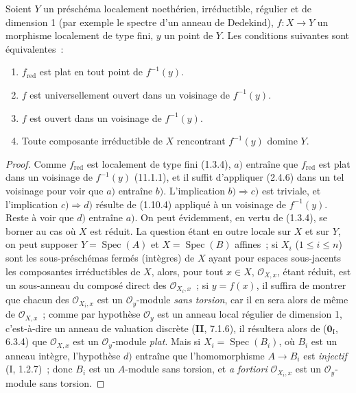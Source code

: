 \begin{proposition}[14.3.8]
Soient $Y$ un préschéma localement noethérien, irréductible, régulier et de
dimension 1 (par exemple le spectre d'un anneau de Dedekind), $f:X\to Y$ un
morphisme localement de type fini, $y$ un point de $Y$. Les conditions suivantes
sont équivalentes~:
\begin{enumerate}[label=\emph{\alph*)}]
  \item $f_{\mathrm{red}}$ est plat en tout point de $f^{-1}(y)$.
  \item $f$ est universellement ouvert dans un voisinage de $f^{-1}(y)$.
  \item $f$ est ouvert dans un voisinage de $f^{-1}(y)$.
  \item Toute composante irréductible de $X$ rencontrant $f^{-1}(y)$ domine $Y$.
\end{enumerate}
\end{proposition}

\begin{proof}
Comme $f_{\mathrm{red}}$ est localement de type fini (1.3.4), $a)$ entraîne que
$f_{\mathrm{red}}$ est plat dans un voisinage de $f^{-1}(y)$ (11.1.1), et il
suffit d'appliquer (2.4.6) dans un tel voisinage pour voir que $a)$ entraîne $b)$.
L'implication $b)\Rightarrow c)$ est triviale, et l'implication
$c)\Rightarrow d)$ résulte de (1.10.4) appliqué à un voisinage de $f^{-1}(y)$.
Reste à voir que $d)$ entraîne $a)$. On peut évidemment, en vertu de (1.3.4), se
borner au cas où $X$ est réduit. La question étant en outre locale sur $X$ et sur
$Y$, on peut supposer $Y=\operatorname{Spec}(A)$ et
$X=\operatorname{Spec}(B)$
affines~; si $X_i$ ($1\leq i\leq n$) sont les sous-préschémas fermés (intègres)
de $X$ ayant pour espaces sous-jacents les composantes irréductibles de $X$,
alors, pour tout $x\in X$, $\mathcal O_{X,x}$, étant réduit, est un sous-anneau du
composé direct des $\mathcal O_{X_i,x}$~; si $y=f(x)$, il suffira de montrer que
chacun des $\mathcal O_{X_i,x}$ est un $\mathcal O_y$-module \emph{sans torsion},
car il en sera alors de même de $\mathcal O_{X,x}$~; comme par hypothèse
$\mathcal O_y$ est un anneau local régulier de dimension 1, c'est-à-dire un anneau
de valuation discrète (\textbf{II}, 7.1.6), il résultera alors de
($\mathbf{0}_{\mathrm I}$, 6.3.4) que $\mathcal O_{X,x}$ est un
$\mathcal O_y$-module \emph{plat}. Mais si $X_i=\operatorname{Spec}(B_i)$, où
$B_i$ est un anneau intègre, l'hypothèse $d)$ entraîne que l'homomorphisme
$A\to B_i$ est \emph{injectif} (I, 1.2.7)~; donc $B_i$ est un $A$-module sans
torsion, et \emph{a fortiori} $\mathcal O_{X_i,x}$ est un $\mathcal O_y$-module
sans torsion.
\end{proof}

